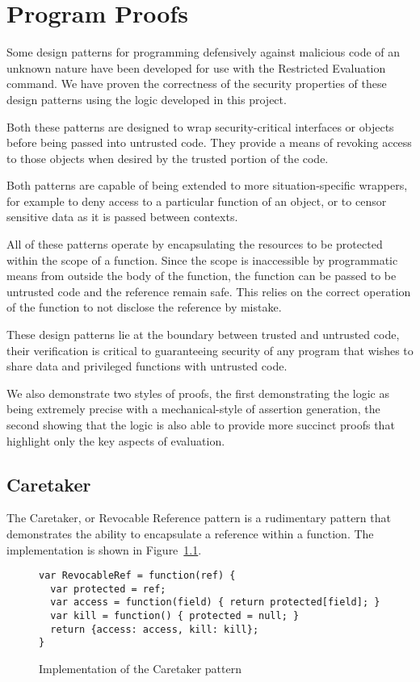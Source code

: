 \documentclass[a4paper,notitlepage]{report}
\begin{document}
\chapter{Program Proofs}
\label{chap:proofs}
Some design patterns for programming defensively against malicious code of an
unknown nature have been developed for use with the Restricted Evaluation
command. We have proven the correctness of the security properties of these
design patterns using the logic developed in this project.

Both these patterns are designed to wrap security-critical interfaces or objects
before being passed into untrusted code. They provide a means of revoking access
to those objects when desired by the trusted portion of the code.

Both patterns are capable of being extended to more situation-specific wrappers,
for example to deny access to a particular function of an object, or to censor
sensitive data as it is passed between contexts.

All of these patterns operate by encapsulating the resources to be protected
within the scope of a function. Since the scope is inaccessible by
programmatic means from outside the body of the function, the function can be
passed to be untrusted code and the reference remain safe. This relies on the
correct operation of the function to not disclose the reference by mistake.

These design patterns lie at the boundary between trusted and untrusted
code, their verification is critical to guaranteeing security of any program
that wishes to share data and privileged functions with untrusted code.

We also demonstrate two styles of proofs, the first demonstrating the logic as
being extremely precise with a mechanical-style of assertion generation, the
second showing that the logic is also able to provide more succinct proofs that
highlight only the key aspects of evaluation.

\section{Caretaker}
The Caretaker, or Revocable Reference pattern is a rudimentary pattern that
demonstrates the ability to encapsulate a reference within a function. The
implementation is shown in Figure~\ref{fig:code:caretaker}.

\begin{figure}[h!]
  \label{fig:code:caretaker}
\begin{verbatim}var RevocableRef = function(ref) {
  var protected = ref;
  var access = function(field) { return protected[field]; }
  var kill = function() { protected = null; }
  return {access: access, kill: kill};
}\end{verbatim}
  \caption{Implementation of the Caretaker pattern}
\end{figure}
\end{document}
